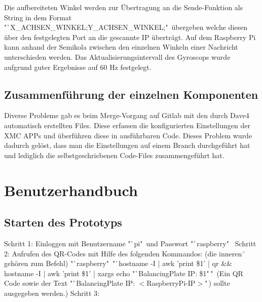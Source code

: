 \documentclass[12pt,a4paper,bibliography=totoc,listof=totoc]{scrartcl}
\begin{document}
Die aufbereiteten Winkel werden zur Übertragung an die Sende-Funktion als String in dem Format 
"`X\_ACHSEN\_WINKEL;Y\_ACHSEN\_WINKEL;"\ übergeben welche diesen über den festgelegten Port an die gescannte IP überträgt.
Auf dem Raspberry Pi kann anhand der Semikola zwischen den einzelnen Winkeln einer Nachricht unterschieden werden. 
Das Aktualisierungsintervall des Gyroscops wurde aufgrund guter Ergebnisse auf 60 Hz festgelegt. 

\subsection{Zusammenführung der einzelnen Komponenten}
Diverse Probleme gab es beim Merge-Vorgang auf Gitlab mit den durch Dave4 automatisch erstellten Files. 
Diese erfassen die konfigurierten Einstellungen der XMC APPs und überführen diese in ausführbaren Code. 
Dieses Problem wurde dadurch gelöst, dass man die Einstellungen auf einem Branch durchgeführt hat und 
lediglich die selbstgeschriebenen Code-Files zusammengeführt hat.

\pagebreak
\section{Benutzerhandbuch}
\subsection{Starten des Prototyps}
Schritt 1:
Einloggen mit Benutzername "`pi"\ und Passwort "`raspberry"\
\newline
Schritt 2: Aufrufen des QR-Codes mit Hilfe des folgenden Kommandos: 
\newline(die inneren \"\, gehören zum Befehl)
\newline\newline
"`raspberry"\ "`hostname -I | awk '{print \$1}' | qr \&\& hostname -I | awk '{print \$1}' | xargs echo "`BalancingPlate IP: \$1"\,"\,
\newline\newline
    (Ein QR Code sowie der Text "`BalancingPlate IP: $<$RaspberryPi-IP$>$"\,) sollte ausgegeben werden.)
\newline
Schritt 3:
\end{document}
